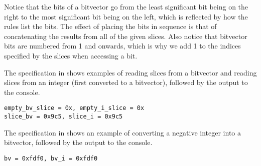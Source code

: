 
Notice that the bits of a bitvector go from the least significant bit being on the right to the most significant bit being on the left,
which is reflected by how the rules list the bits.
The effect of placing the bits in sequence is that of concatenating the results
from all of the given slices.
Also notice that bitvector bits are numbered from 1 and onwards, which is why we add 1 to the indices specified
by the slices when accessing a bit.

The specification in  shows examples of reading slices from a bitvector
and reading slices from an integer (first converted to a bitvector), followed by the output to the console.

\begin{Verbatim}[fontsize=\footnotesize, frame=single]
empty_bv_slice = 0x, empty_i_slice = 0x
slice_bv = 0x9c5, slice_i = 0x9c5
\end{Verbatim}

The specification in  shows an example of converting a negative
integer into a bitvector, followed by the output to the console.

\begin{Verbatim}[fontsize=\footnotesize, frame=single]
bv = 0xfdf0, bv_i = 0xfdf0
\end{Verbatim}

